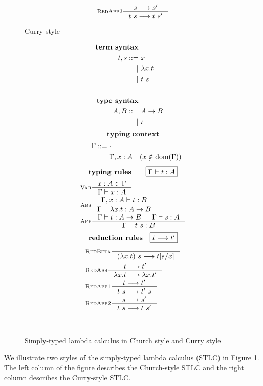 \begin{figure}
\begin{singlespace}
\begin{minipage}{.46\textwidth}
\begin{align*}
& \inference[\sc RedApp2]{s --> s'}{t~s --> t~s'} \\
\end{align*}
\end{minipage}
\begin{minipage}{.46\textwidth}
	\begin{center}Curry-style\end{center}
\def\baselinestretch{0}
\small
\begin{align*}
\textbf{term syntax} \\
t,s ::= &~ x           \\
      | &~ \lambda x    . t \\
      | &~ t ~ s       \\
\\
\textbf{type syntax} \\
A,B ::= &~ A -> B \\
      | &~ \iota  \\
\end{align*}
\[ \textbf{typing context} \]\vspace*{-1em}
\begin{align*}\quad
\Gamma ::= &~ \cdot \\
	 | &~ \Gamma, x:A \quad (x\notin \mathop{\mathrm{dom}}(\Gamma)) \\
\end{align*}
\[ \textbf{typing rules}
	\qquad \framebox{$\Gamma |- t : A$} \]
\vspace*{-1em}
\begin{align*}
& \inference[\sc Var]{x:A \in \Gamma}{\Gamma |- x:A} \\
& \inference[\sc Abs]{\Gamma,x:A |- t : B}
		     {\Gamma |- \l x   .t : A -> B} \\
& \inference[\sc App]{\Gamma |- t : A -> B & \Gamma |- s : A}
		     {\Gamma |- t~s : B} \\
\end{align*}
\[ \textbf{reduction rules}
	\quad \framebox{$t --> t'$} \]
\vspace*{-1em}
\begin{align*}
& \inference[\sc RedBeta]{}{(\l x   .t)~s --> t[s/x]} \\
& \inference[\sc RedAbs]{t --> t'}{\l x   .t --> \l x   .t'} \\
& \inference[\sc RedApp1]{t --> t'}{t~s --> t'~s} \\
& \inference[\sc RedApp2]{s --> s'}{t~s --> t~s'} \\
\end{align*}
\end{minipage}
~\\
\caption{Simply-typed lambda calculus in Church style and Curry style}
\label{fig:stlc}
\end{singlespace}
\end{figure}
We illustrate two styles of the simply-typed lambda calculus (STLC)
in Figure \ref{fig:stlc}. The left column of the figure describes
the Church-style STLC and the right column describes the Curry-style STLC.

